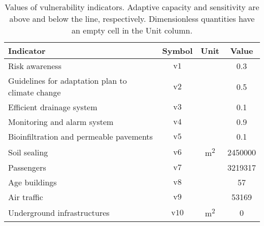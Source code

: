 \begin{table}[h]
  \renewcommand*{\arraystretch}{1.5}
  \centering
  \caption{Values of vulnerability indicators. Adaptive capacity and sensitivity are above and below the line, respectively. Dimensionless quantities have an empty cell in the Unit column.}
  \label{tab:values_vulnerability}
  \begin{tabular}{p{}ccc}
    Indicator                                        & Symbol         & Unit                 & Value   \\
    \hline
    Risk awareness                                   & $\mathrm{v1}$  &                      & 0.3     \\
    Guidelines for adaptation plan to climate change & $\mathrm{v2}$  &                      & 0.5     \\
    Efficient drainage system                        & $\mathrm{v3}$  &                      & 0.1     \\
    Monitoring and alarm system                      & $\mathrm{v4}$  &                      & 0.9     \\
    Bioinfiltration and permeable pavements          & $\mathrm{v5}$  &                      & 0.1     \\
    \hline
    Soil sealing                                     & $\mathrm{v6}$  & \unit{\square\metre} & 2450000 \\
    Passengers                                       & $\mathrm{v7}$  &                      & 3219317 \\
    Age buildings                                    & $\mathrm{v8}$  &                      & 57      \\
    Air traffic                                      & $\mathrm{v9}$  &                      & 53169   \\
    Underground infrastructures                      & $\mathrm{v10}$ & \unit{\square\metre} & 0       \\
    \end{tabular}
\end{table}
